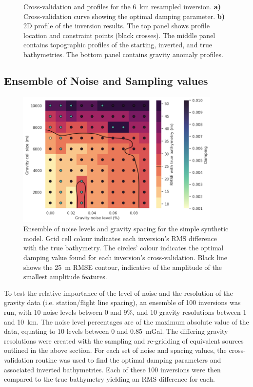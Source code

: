 \begin{figure}[!ht]
\begin{subfigure}[t]{.58\textwidth}
        \caption{}
    \end{subfigure}
  \caption[Synthetic inversion with sampled gravity, CV and profile]{Cross-validation and profiles for the 6~km resampled inversion. \textbf{a)} Cross-validation curve showing the optimal damping parameter. \textbf{b)} 2D profile of the inversion results. The top panel shows profile location and constraint points (black crosses). The middle panel contains topographic profiles of the starting, inverted, and true bathymetries. The bottom panel contains gravity anomaly profiles.}
    \label{fig:chp3_simple_sampled_CV_and_profile}
\end{figure}

\subsection{Ensemble of Noise and Sampling values} \label{chp3:simple_ensemble}

\begin{figure}[!ht]
    \centering
    \includegraphics[width=0.9\textwidth]{figures/chp3/chp3_simple_ensemble.png}
    \caption[Gravity data ensemble for synthetic model]{Ensemble of noise levels and gravity spacing for the simple synthetic model. Grid cell colour indicates each inversion's RMS difference with the true bathymetry. The circles' colour indicates the optimal damping value found for each inversion's cross-validation. Black line shows the 25~m RMSE contour, indicative of the amplitude of the smallest amplitude features.}
    \label{fig:chp3_simple_ensemble}
\end{figure}

To test the relative importance of the level of noise and the resolution of the gravity data (i.e. station/flight line spacing), an ensemble of 100 inversions was run, with 10 noise levels between 0 and 9\%, and 10 gravity resolutions between 1 and 10~km. The noise level percentages are of the maximum absolute value of the data, equating to 10 levels between 0 and 0.85~mGal. The differing gravity resolutions were created with the sampling and re-gridding of equivalent sources outlined in the above section. For each set of noise and spacing values, the cross-validation routine was used to find the optimal damping parameters and associated inverted bathymetries. Each of these 100 inversions were then compared to the true bathymetry yielding an RMS difference for each. 


